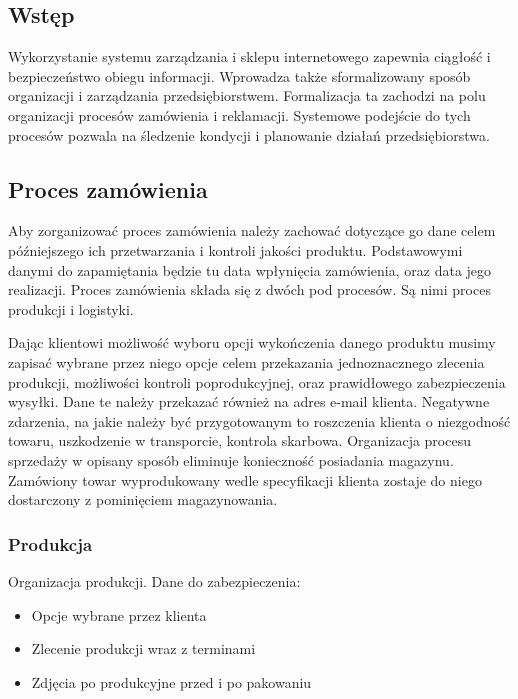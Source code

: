 		\subsection{Wstęp}
			\par Wykorzystanie systemu zarządzania i sklepu internetowego zapewnia ciągłość i bezpieczeństwo obiegu informacji. Wprowadza także sformalizowany sposób organizacji i zarządzania przedsiębiorstwem. Formalizacja ta zachodzi na polu organizacji procesów zamówienia i reklamacji. Systemowe podejście do tych procesów pozwala na śledzenie kondycji i planowanie działań przedsiębiorstwa.
			
		\subsection{Proces zamówienia}  
			\par Aby zorganizować proces zamówienia należy zachować dotyczące go dane celem późniejszego ich przetwarzania i kontroli jakości produktu. Podstawowymi danymi do zapamiętania będzie tu data wpłynięcia zamówienia, oraz data jego realizacji. Proces zamówienia składa się z dwóch pod procesów. Są nimi proces produkcji i logistyki.
			
			\par Dając klientowi możliwość wyboru opcji wykończenia danego produktu musimy zapisać wybrane przez niego opcje celem przekazania jednoznacznego zlecenia produkcji, możliwości kontroli poprodukcyjnej, oraz prawidłowego zabezpieczenia wysyłki. Dane te należy przekazać również na adres e-mail klienta. Negatywne zdarzenia, na jakie należy być przygotowanym to roszczenia klienta o niezgodność towaru, uszkodzenie w transporcie, kontrola skarbowa. Organizacja procesu sprzedaży w opisany sposób eliminuje konieczność posiadania magazynu. Zamówiony towar wyprodukowany wedle specyfikacji klienta zostaje do niego dostarczony z pominięciem magazynowania.
			
			\subsubsection{Produkcja}
				Organizacja produkcji. Dane do zabezpieczenia:
				\begin{itemize}
					\item Opcje wybrane przez klienta 
					\item Zlecenie produkcji wraz z terminami
					\item Zdjęcia po produkcyjne przed i po pakowaniu
				\end{itemize}
				
